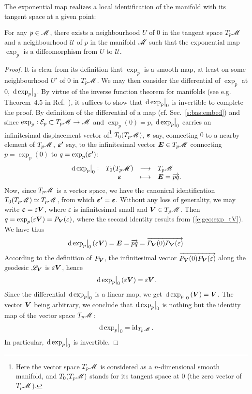 The exponential map realizes a local identification of the manifold
with its tangent space at a given point:
\begin{greybox}
For any $p\in\mathscr{M}$, there exists a neighbourhood $U$ of $0$ in the tangent
space $T_p\mathscr{M}$ and a neighbourhood $\mathscr{U}$ of $p$ in the manifold $\mathscr{M}$
such that the exponential map $\exp_p$ is a diffeomorphism from
$U$ to $\mathscr{U}$.
\end{greybox}
\begin{proof}
It is clear from its definition that $\exp_p$ is a smooth map, at least
on some neighbourhood $U'$ of $0$ in $T_p\mathscr{M}$. We may then consider the
differential of $\exp_p$ at $0$, $\left.\mathrm{d}\exp_p\right| _0$.
By virtue of the inverse function theorem for manifolds (see e.g. Theorem~4.5 in
Ref.~\cite{Lee13}), it suffices to show that
$\left.\mathrm{d}\exp_p\right| _0$ is invertible to complete the proof.
By definition of the differential of a map (cf. Sec.~\ref{s:bas:embed})
and since $\exp_p: \mathcal{E}_p \subset T_p\mathscr{M} \to \mathscr{M}$
and $\exp_p(0) = p$, $\left.\mathrm{d}\exp_p\right| _0$ carries an
infinitesimal displacement vector of\footnote{Here the vector space $T_p\mathscr{M}$ is considered
as a $n$-dimensional smooth manifold, and $T_0(T_p\mathscr{M})$ stands for its tangent space
at $0$ (the zero vector of $T_p\mathscr{M}$).} $T_0(T_p\mathscr{M})$, $\bm{\varepsilon}$ say, connecting $0$ to a nearby element of $T_p\mathscr{M}$, $\bm{\varepsilon'}$ say,
to the infinitesimal vector $\bm{E}\in T_p\mathscr{M}$ connecting
$p=\exp_p(0)$ to $q=\exp_p(\bm{\varepsilon'})$:
\[
    \begin{array}{cccl}
    \left.\mathrm{d}\exp_p\right| _0: & T_0(T_p\mathscr{M}) & \longrightarrow & T_p\mathscr{M} \\
        & \bm{\varepsilon} & \longmapsto & \bm{E} = \overrightarrow{pq}.
    \end{array}
\]
Now, since $T_p\mathscr{M}$ is a vector space, we have the canonical identification
$T_0(T_p\mathscr{M}) \simeq T_p\mathscr{M}$, from which $\bm{\varepsilon'} = \bm{\varepsilon}$.
Without any loss of generality, we may write $\bm{\varepsilon} = \varepsilon \bm{V}$,
where $\varepsilon$ is infinitesimal small and $\bm{V}\in T_p\mathscr{M}$. Then
$q = \exp_p(\varepsilon \bm{V}) = P_{\bm{V}}(\varepsilon)$, where the second
identity results from (\ref{e:geo:exp_tV}). We have thus
\[
    \left.\mathrm{d}\exp_p\right| _0(\varepsilon \bm{V}) = \bm{E} = \overrightarrow{pq} =
    \overrightarrow{P_{\bm{V}}(0) P_{\bm{V}}(\varepsilon)} .
\]
According to the definition of $P_{\bm{V}}$, the infinitesimal vector
$\overrightarrow{P_{\bm{V}}(0) P_{\bm{V}}(\varepsilon)}$ along the geodesic $\mathscr{L}_{\bm{V}}$
is $\varepsilon \bm{V}$, hence
\[
    \left.\mathrm{d}\exp_p\right| _0(\varepsilon \bm{V}) = \varepsilon \bm{V} .
\]
Since the differential $\left.\mathrm{d}\exp_p\right| _0$ is a linear map, we
get $\left.\mathrm{d}\exp_p\right| _0(\bm{V}) = \bm{V}$. The vector $\bm{V}$ being arbitrary,
we conclude that $\left.\mathrm{d}\exp_p\right| _0$ is nothing but the identity map of
the vector space $T_p\mathscr{M}$:
\[
    \left.\mathrm{d}\exp_p\right| _0 = \operatorname{id}_{T_p\mathscr{M}} .
\]
In particular, $\left.\mathrm{d}\exp_p\right| _0$ is invertible.
\end{proof}

